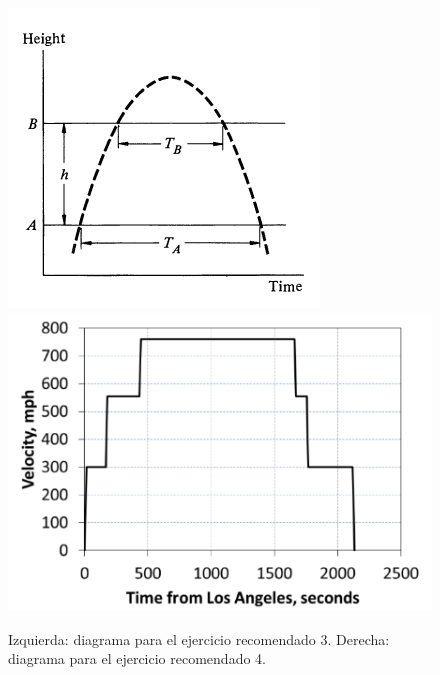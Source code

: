 \documentclass[letterpaper,10pt,onecolumn]{article}
\begin{document}
\begin{figure}[!h]
\begin{center}
\includegraphics[scale=0.6]{altura.jpg} 
\includegraphics[scale=0.3]{hyperloop.png} 
\end{center}
\caption{Izquierda: diagrama para el ejercicio recomendado 3. Derecha: diagrama para el ejercicio recomendado 4.} 
\label{fig:tiro}
\end{figure}
\end{document}
